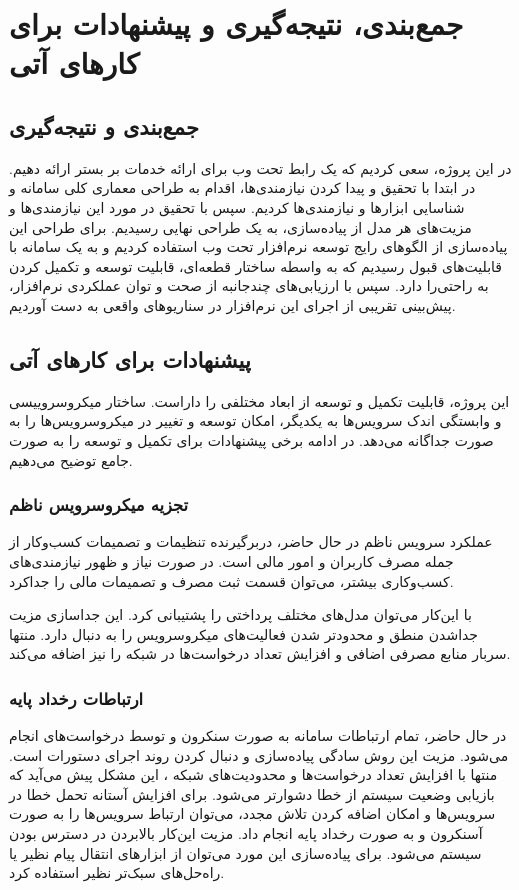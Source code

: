 \chapter{جمع‌بندی، نتیجه‌گیری و پیشنهادات برای کارهای آتی}
\section{جمع‌بندی و نتیجه‌گیری}
در این پروژه، سعی کردیم که یک رابط تحت وب برای ارائه خدمات  بر بستر  ارائه دهیم. در ابتدا با تحقیق و پیدا کردن نیازمندی‌ها، اقدام به طراحی معماری کلی سامانه و شناسایی ابزار‌ها و نیازمندی‌ها کردیم. سپس با تحقیق در مورد این نیازمندی‌ها و مزیت‌های هر مدل از پیاده‌سازی، به یک طراحی نهایی رسیدیم. برای طراحی این پیاده‌سازی از الگو‌های رایج توسعه نرم‌افزار تحت وب استفاده کردیم و به یک سامانه با قابلیت‌های قبول رسیدیم که به واسطه ساختار قطعه‌ای، قابلیت توسعه و تکمیل کردن به راحتی‌را دارد. سپس با ارزیابی‌های چندجانبه از صحت و توان عملکردی نرم‌افزار، پیش‌بینی تقریبی از اجرای این نرم‌افزار در سناریو‌های واقعی به دست آوردیم.

\section{پیشنهادات برای کارهای آتی}
این پروژه، قابلیت تکمیل و توسعه از ابعاد مختلفی را داراست. ساختار میکروسروییسی و وابستگی اندک سرویس‌ها به یکدیگر، امکان توسعه و تغییر در میکروسرویس‌ها را به صورت جداگانه می‌دهد. در ادامه برخی پیشنهادات برای تکمیل و توسعه را به صورت جامع توضیح می‌دهیم.

\subsection{تجزیه میکروسرویس ناظم}
عملکرد سرویس ناظم در حال حاضر، دربرگیرنده تنظیمات و تصمیمات کسب‌و‌کار از جمله مصرف کاربران و امور مالی است. در صورت نیاز و ظهور نیازمندی‌های کسب‌و‌کاری بیشتر، می‌توان قسمت ثبت مصرف و تصمیمات مالی را جداکرد. 

با این‌کار می‌توان مدل‌های مختلف پرداختی را پشتیبانی کرد. این جداسازی مزیت جداشدن منطق و محدودتر شدن فعالیت‌های میکروسرویس را به دنبال دارد. منتها سربار منابع مصرفی اضافی و افزایش تعداد درخواست‌ها در شبکه را نیز اضافه می‌کند.


\subsection{ارتباطات رخداد پایه}
در حال حاضر، تمام ارتباطات سامانه به صورت سنکرون و توسط درخواست‌های  انجام می‌شود. مزیت این روش سادگی پیاده‌سازی و دنبال کردن روند اجرای‌ دستورات است. منتها با افزایش تعداد درخواست‌ها و محدودیت‌های شبکه ، این مشکل پیش می‌آید که بازیابی وضعیت سیستم از خطا دشوارتر می‌شود. برای افزایش آستانه تحمل خطا در سرویس‌ها و امکان اضافه کردن تلاش مجدد، می‌توان ارتباط سرویس‌ها را به صورت آسنکرون و به صورت رخداد پایه انجام داد. مزیت این‌کار بالابردن در دسترس بودن سیستم می‌شود. برای پیاده‌سازی این مورد می‌توان از ابزارهای انتقال پیام نظیر  یا راه‌حل‌های سبک‌تر نظیر  استفاده کرد. 

